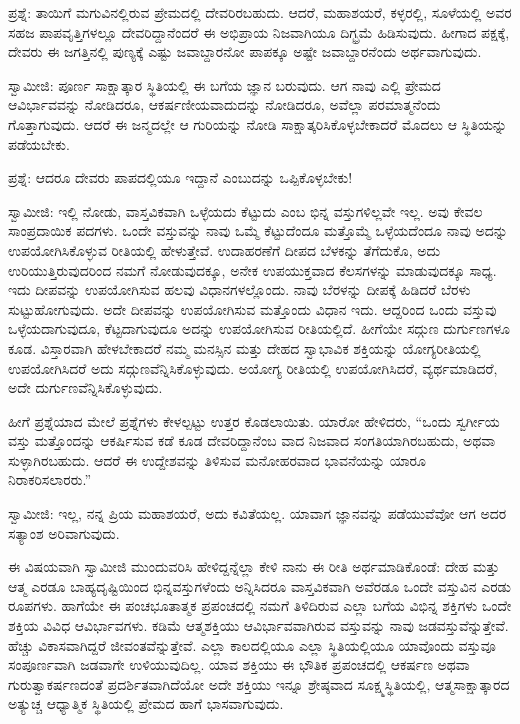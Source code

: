 ಪ್ರಶ್ನೆ: ತಾಯಿಗೆ ಮಗುವಿನಲ್ಲಿರುವ ಪ್ರೇಮದಲ್ಲಿ ದೇವರಿರಬಹುದು. ಆದರೆ, ಮಹಾಶಯರೆ, ಕಳ್ಳರಲ್ಲಿ, ಸೂಳೆಯಲ್ಲಿ ಅವರ ಸಹಜ ಪಾಪವೃತ್ತಿಗಳಲ್ಲೂ ದೇವರಿದ್ದಾನೆಂದರೆ ಈ ಅಭಿಪ್ರಾಯ ನಿಜವಾಗಿಯೂ ದಿಗ್ಭ್ರಮೆ ಹಿಡಿಸುವುದು. ಹೀಗಾದ ಪಕ್ಷಕ್ಕೆ, ದೇವರು ಈ ಜಗತ್ತಿನಲ್ಲಿ ಪುಣ್ಯಕ್ಕೆ ಎಷ್ಟು ಜವಾಬ್ದಾರನೋ ಪಾಪಕ್ಕೂ ಅಷ್ಟೇ ಜವಾಬ್ದಾರನೆಂದು ಅರ್ಥವಾಗುವುದು.

ಸ್ವಾಮೀಜಿ: ಪೂರ್ಣ ಸಾಕ್ಷಾತ್ಕಾರ ಸ್ಥಿತಿಯಲ್ಲಿ ಈ ಬಗೆಯ ಜ್ಞಾನ ಬರುವುದು. ಆಗ ನಾವು ಎಲ್ಲಿ ಪ್ರೇಮದ ಆವಿರ್ಭಾವವನ್ನು ನೋಡಿದರೂ, ಆಕರ್ಷಣೀಯವಾದುದನ್ನು ನೋಡಿದರೂ, ಅವೆಲ್ಲಾ ಪರಮಾತ್ಮನೆಂದು ಗೊತ್ತಾಗುವುದು. ಆದರೆ ಈ ಜನ್ಮದಲ್ಲೇ ಆ ಗುರಿಯನ್ನು ನೋಡಿ ಸಾಕ್ಷಾತ್ಕರಿಸಿಕೊಳ್ಳಬೇಕಾದರೆ ಮೊದಲು ಆ ಸ್ಥಿತಿಯನ್ನು ಪಡೆಯಬೇಕು.

ಪ್ರಶ್ನೆ: ಆದರೂ ದೇವರು ಪಾಪದಲ್ಲಿಯೂ ಇದ್ದಾನೆ ಎಂಬುದನ್ನು ಒಪ್ಪಿಕೊಳ್ಳಬೇಕು!

ಸ್ವಾಮೀಜಿ: ಇಲ್ಲಿ ನೋಡು, ವಾಸ್ತವಿಕವಾಗಿ ಒಳ್ಳೆಯದು ಕೆಟ್ಟುದು ಎಂಬ ಭಿನ್ನ ವಸ್ತುಗಳಿಲ್ಲವೇ ಇಲ್ಲ. ಅವು ಕೇವಲ ಸಾಂಪ್ರದಾಯಿಕ ಪದಗಳು. ಒಂದೇ ವಸ್ತುವನ್ನು ನಾವು ಒಮ್ಮೆ ಕೆಟ್ಟುದೆಂದೂ ಮತ್ತೊಮ್ಮೆ ಒಳ್ಳೆಯದೆಂದೂ ನಾವು ಅದನ್ನು ಉಪಯೋಗಿಸಿಕೊಳ್ಳುವ ರೀತಿಯಲ್ಲಿ ಹೇಳುತ್ತೇವೆ. ಉದಾಹರಣೆಗೆ ದೀಪದ ಬೆಳಕನ್ನು ತೆಗೆದುಕೊ, ಅದು ಉರಿಯುತ್ತಿರುವುದರಿಂದ ನಮಗೆ ನೋಡುವುದಕ್ಕೂ, ಅನೇಕ ಉಪಯುಕ್ತವಾದ ಕೆಲಸಗಳನ್ನು ಮಾಡುವುದಕ್ಕೂ ಸಾಧ್ಯ. ಇದು ದೀಪವನ್ನು ಉಪಯೋಗಿಸುವ ಹಲವು ವಿಧಾನಗಳಲ್ಲೊಂದು. ನಾವು ಬೆರಳನ್ನು ದೀಪಕ್ಕೆ ಹಿಡಿದರೆ ಬೆರಳು ಸುಟ್ಟುಹೋಗುವುದು. ಅದೇ ದೀಪವನ್ನು ಉಪಯೋಗಿಸುವ ಮತ್ತೊಂದು ವಿಧಾನ ಇದು. ಆದ್ದರಿಂದ ಒಂದು ವಸ್ತುವು ಒಳ್ಳೆಯದಾಗುವುದೂ, ಕೆಟ್ಟದಾಗುವುದೂ ಅದನ್ನು ಉಪಯೋಗಿಸುವ ರೀತಿಯಲ್ಲಿದೆ. ಹೀಗೆಯೇ ಸದ್ಗುಣ ದುರ್ಗುಣಗಳೂ ಕೂಡ. ವಿಸ್ತಾರವಾಗಿ ಹೇಳಬೇಕಾದರೆ ನಮ್ಮ ಮನಸ್ಸಿನ ಮತ್ತು ದೇಹದ ಸ್ವಾಭಾವಿಕ ಶಕ್ತಿಯನ್ನು ಯೋಗ್ಯರೀತಿಯಲ್ಲಿ ಉಪಯೋಗಿಸಿದರೆ ಅದು ಸದ್ಗುಣವೆನ್ನಿಸಿಕೊಳ್ಳುವುದು. ಅಯೋಗ್ಯ ರೀತಿಯಲ್ಲಿ ಉಪಯೋಗಿಸಿದರೆ, ವ್ಯರ್ಥಮಾಡಿದರೆ, ಅದೇ ದುರ್ಗುಣವೆನ್ನಿಸಿಕೊಳ್ಳುವುದು.

ಹೀಗೆ ಪ್ರಶ್ನೆಯಾದ ಮೇಲೆ ಪ್ರಶ್ನೆಗಳು ಕೇಳಲ್ಪಟ್ಟು ಉತ್ತರ ಕೊಡಲಾಯಿತು. ಯಾರೋ ಹೇಳಿದರು, “ಒಂದು ಸ್ವರ್ಗೀಯ ವಸ್ತು ಮತ್ತೊಂದನ್ನು ಆಕರ್ಷಿಸುವ ಕಡೆ ಕೂಡ ದೇವರಿದ್ದಾನೆಂಬ ವಾದ ನಿಜವಾದ ಸಂಗತಿಯಾಗಿರಬಹುದು, ಅಥವಾ ಸುಳ್ಳಾಗಿರಬಹುದು. ಆದರೆ ಈ ಉದ್ದೇಶವನ್ನು ತಿಳಿಸುವ ಮನೋಹರವಾದ ಭಾವನೆಯನ್ನು ಯಾರೂ ನಿರಾಕರಿಸಲಾರರು.”

ಸ್ವಾಮೀಜಿ: ಇಲ್ಲ, ನನ್ನ ಪ್ರಿಯ ಮಹಾಶಯರೆ, ಅದು ಕವಿತೆಯಲ್ಲ. ಯಾವಾಗ ಜ್ಞಾನವನ್ನು ಪಡೆಯುವೆವೋ ಆಗ ಅದರ ಸತ್ಯಾಂಶ ಅರಿವಾಗುವುದು.

ಈ ವಿಷಯವಾಗಿ ಸ್ವಾಮೀಜಿ ಮುಂದುವರಿಸಿ ಹೇಳಿದ್ದನ್ನೆಲ್ಲಾ ಕೇಳಿ ನಾನು ಈ ರೀತಿ ಅರ್ಥಮಾಡಿಕೊಂಡೆ: ದೇಹ ಮತ್ತು ಆತ್ಮ ಎರಡೂ ಬಾಹ್ಯದೃಷ್ಟಿಯಿಂದ ಭಿನ್ನವಸ್ತುಗಳೆಂದು ಅನ್ನಿಸಿದರೂ ವಾಸ್ತವಿಕವಾಗಿ ಅವೆರಡೂ ಒಂದೇ ವಸ್ತುವಿನ ಎರಡು ರೂಪಗಳು. ಹಾಗೆಯೇ ಈ ಪಂಚಭೂತಾತ್ಮಕ ಪ್ರಪಂಚದಲ್ಲಿ ನಮಗೆ ತಿಳಿದಿರುವ ಎಲ್ಲಾ ಬಗೆಯ ವಿಭಿನ್ನ ಶಕ್ತಿಗಳು ಒಂದೇ ಶಕ್ತಿಯ ವಿವಿಧ ಆವಿರ್ಭಾವಗಳು. ಕಡಿಮೆ ಆತ್ಮಶಕ್ತಿಯು ಆವಿರ್ಭಾವವಾಗಿರುವ ವಸ್ತುವನ್ನು ನಾವು ಜಡವಸ್ತುವೆನ್ನುತ್ತೇವೆ. ಹೆಚ್ಚು ವಿಕಾಸವಾಗಿದ್ದರೆ ಜೀವಂತವೆನ್ನುತ್ತೇವೆ. ಎಲ್ಲಾ ಕಾಲದಲ್ಲಿಯೂ ಎಲ್ಲಾ ಸ್ಥಿತಿಯಲ್ಲಿಯೂ ಯಾವೊಂದು ವಸ್ತುವೂ ಸಂಪೂರ್ಣವಾಗಿ ಜಡವಾಗೇ ಉಳಿಯುವುದಿಲ್ಲ. ಯಾವ ಶಕ್ತಿಯು ಈ ಭೌತಿಕ ಪ್ರಪಂಚದಲ್ಲಿ ಆಕರ್ಷಣ ಅಥವಾ ಗುರುತ್ವಾಕರ್ಷಣದಂತೆ ಪ್ರದರ್ಶಿತವಾಗಿದೆಯೋ ಅದೇ ಶಕ್ತಿಯು ಇನ್ನೂ ಶ್ರೇಷ್ಠವಾದ ಸೂಕ್ಷ್ಮಸ್ಥಿತಿಯಲ್ಲಿ, ಆತ್ಮಸಾಕ್ಷಾತ್ಕಾರದ ಅತ್ಯುಚ್ಚ ಆಧ್ಯಾತ್ಮಿಕ ಸ್ಥಿತಿಯಲ್ಲಿ ಪ್ರೇಮದ ಹಾಗೆ ಭಾಸವಾಗುವುದು.

